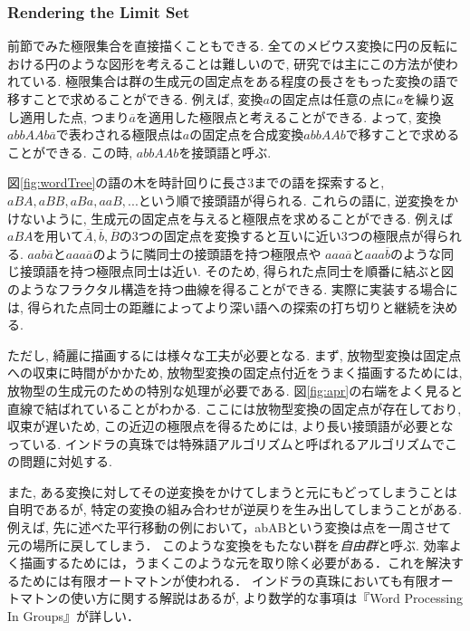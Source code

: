 \subsubsection{Rendering the Limit Set}

前節でみた極限集合を直接描くこともできる.
全てのメビウス変換に円の反転における円のような図形を考えることは難しいので, 研究では主にこの方法が使われている.
極限集合は群の生成元の固定点をある程度の長さをもった変換の語で移すことで求めることができる.
例えば, 変換$a$の固定点は任意の点に$a$を繰り返し適用した点, つまり$\overline{a}$を適用した極限点と考えることができる.
よって, 変換$abbAAb\overline{a}$で表わされる極限点は$a$の固定点を合成変換$abbAAb$で移すことで求めることができる.
この時, $abbAAb$を接頭語と呼ぶ.

図\ref{fig:wordTree}の語の木を時計回りに長さ3までの語を探索すると,$ aBA, aBB, aBa, aaB, ...$という順で接頭語が得られる.
これらの語に, 逆変換をかけないように, 生成元の固定点を与えると極限点を求めることができる.
例えば$aBA$を用いて$\overline{A}, \overline{b}, \overline{B}$の3つの固定点を変換すると互いに近い3つの極限点が得られる.
$aab\overline{a}$と$aaa\overline{a}$のように隣同士の接頭語を持つ極限点や $aaa\overline{a}$と$aaa\overline{b}$のような同じ接頭語を持つ極限点同士は近い.
そのため, 得られた点同士を順番に結ぶと図のようなフラクタル構造を持つ曲線を得ることができる.
実際に実装する場合には, 得られた点同士の距離によってより深い語への探索の打ち切りと継続を決める.

ただし, 綺麗に描画するには様々な工夫が必要となる.
まず, 放物型変換は固定点への収束に時間がかかため, 放物型変換の固定点付近をうまく描画するためには, 放物型の生成元のための特別な処理が必要である.
図\ref{fig:apr}の右端をよく見ると直線で結ばれていることがわかる.
ここには放物型変換の固定点が存在しており, 収束が遅いため, この近辺の極限点を得るためには, より長い接頭語が必要となっている.
インドラの真珠では特殊語アルゴリズムと呼ばれるアルゴリズムでこの問題に対処する.

また, ある変換に対してその逆変換をかけてしまうと元にもどってしまうことは自明であるが, 特定の変換の組み合わせが逆戻りを生み出してしまうことがある.
例えば, 先に述べた平行移動の例において，abABという変換は点を一周させて元の場所に戻してしまう．
このような変換をもたない群を\emph{自由群}と呼ぶ.
効率よく描画するためには，うまくこのような元を取り除く必要がある．これを解決するためには有限オートマトンが使われる．
インドラの真珠においても有限オートマトンの使い方に関する解説はあるが, より数学的な事項は『Word Processing In Groups』\cite{wordProcessing}が詳しい．

